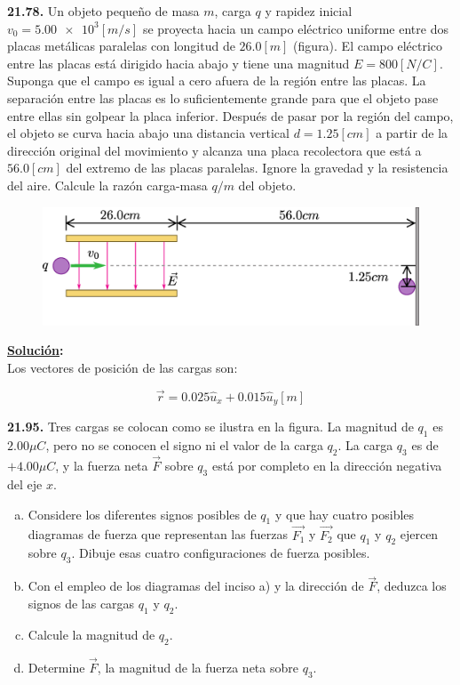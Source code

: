 \documentclass[letter,11pt]{article}
\begin{document}
\textbf{21.78.}
Un objeto pequeño de masa $m$, carga $q$ y rapidez inicial
$v_0 = \num{5.00e3} [m/s]$ se proyecta hacia un campo eléctrico uniforme entre
dos placas metálicas paralelas con longitud de $26.0 [m]$ (figura).
El campo eléctrico entre las placas está dirigido hacia abajo y tiene una
magnitud $E = 800 [N/C]$. Suponga que el campo es igual a cero afuera de la
región entre las placas. La separación entre las placas es lo suficientemente
grande para que el objeto pase entre ellas sin golpear la placa inferior.
Después de pasar por la región del campo, el objeto se curva hacia abajo una
distancia vertical $d = 1.25 [cm]$ a partir de la dirección original del
movimiento y alcanza una placa recolectora que está a $56.0 [cm]$ del extremo
de las placas paralelas. Ignore la gravedad y la resistencia del aire. Calcule
la razón carga-masa $q/m$ del objeto.

\begin{figure}[!h]
\centering
\includegraphics[scale=0.35]{resources/f2.eps}
\end{figure}

\vspace{0.5cm}
\textbf{\underline{Solución}:} \\

Los vectores de posición de las cargas son:

\begin{equation*}
    \vec{r} = 0.025 \hat{u}_x + 0.015 \hat{u}_y [m]
\end{equation*}

\textbf{21.95.}
Tres cargas se colocan como se ilustra en la figura. La magnitud de $q_1$ es
$2.00 \mu C$, pero no se conocen el signo ni el valor de la carga $q_2$. La
carga $q_3$ es de $+4.00 \mu C$, y la fuerza neta $\vec{F}$ sobre $q_3$ está
por completo en la dirección negativa del eje $x$.

\begin{enumerate}[a)]
\item Considere los diferentes signos posibles de $q_1$ y que hay cuatro
posibles diagramas de fuerza que representan las fuerzas $\vec{F_1}$ y
$\vec{F_2}$ que $q_1$ y $q_2$ ejercen sobre $q_3$. Dibuje esas cuatro
configuraciones de fuerza posibles.
\item Con el empleo de los diagramas del inciso a) y la dirección de $\vec{F}$,
deduzca los signos de las cargas $q_1$ y $q_2$.
\item Calcule la magnitud de $q_2$.
\item Determine $\vec{F}$, la magnitud de la fuerza neta sobre $q_3$.
\end{enumerate}
\end{document}
